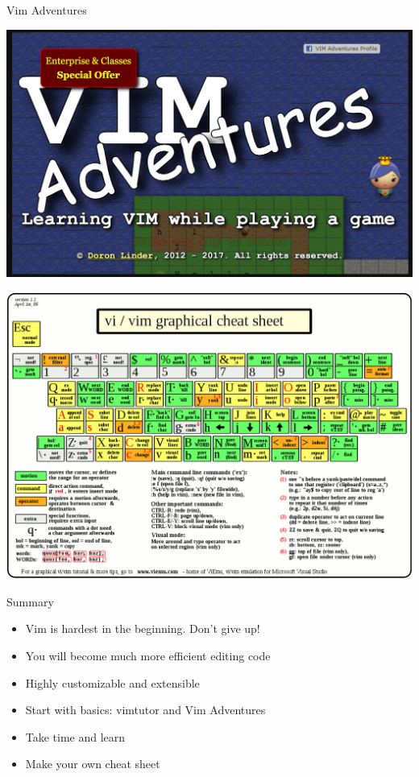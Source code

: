 \documentclass{beamer}
\begin{document}
\begin{frame}{Vim Adventures}
    \begin{center}
        \includegraphics[width=1\textwidth]{images/vim-adventure.png}
    \end{center}
\end{frame}

\begin{frame}
    \begin{center}
        \includegraphics[width=1\textwidth]{images/cheat-sheet.png}
    \end{center}
\end{frame}

\begin{frame}{Summary}
    \begin{itemize}
        \item Vim is hardest in the beginning. Don't give up!
        \item You will become much more efficient editing code
        \item Highly customizable and extensible
        \item Start with basics: vimtutor and Vim Adventures
        \item Take time and learn
        \item Make your own cheat sheet
    \end{itemize}
\end{frame}
\end{document}

